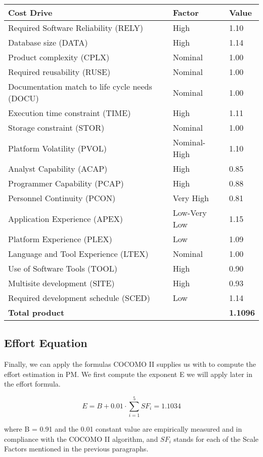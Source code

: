 \begin{tabular}{ | l | l| l |}
\hline
	\textbf {Cost Drive} & \textbf {Factor} & \textbf {Value} \\ \hline\hline
	Required Software Reliability (RELY) & High & 1.10 \\
	Database size (DATA) & High & 1.14  \\
	Product complexity (CPLX)  & Nominal & 1.00 \\
	Required reusability (RUSE)& Nominal & 1.00 \\
	Documentation match to life cycle needs (DOCU) & Nominal & 1.00 \\
	Execution time constraint (TIME)& High & 1.11 \\
	Storage constraint (STOR) & Nominal & 1.00 \\
	Platform Volatility (PVOL) & Nominal-High & 1.10 \\
	Analyst Capability (ACAP) & High & 0.85 \\
	Programmer Capability (PCAP) & High & 0.88 \\
	Personnel Continuity (PCON)& Very High & 0.81 \\
	Application Experience (APEX) & Low-Very Low & 1.15 \\
	Platform Experience (PLEX) & Low & 1.09 \\
	Language and Tool Experience (LTEX)& Nominal & 1.00 \\
	Use of Software Tools (TOOL)& High & 0.90 \\
	Multisite development (SITE)& High & 0.93 \\
	Required development schedule (SCED)& Low &1.14 \\ \hline
	\multicolumn{1}{|l|}{\textbf{Total product}} && \textbf{1.1096} \\ \hline
\end{tabular}

\subsection{Effort Equation}

Finally, we can apply the formulas COCOMO II supplies us with to compute the effort estimation in PM.
We first compute the exponent E we will apply later in the effort formula.

\[ E = B + 0.01 \cdot \sum_{i=1}^5 SF_i = 1.1034 \]

where B = 0.91 and the 0.01 constant value are empirically measured and in compliance with the COCOMO II algorithm, and \( SF_i \) stands for each of the Scale Factors mentioned in the previous paragraphs.

